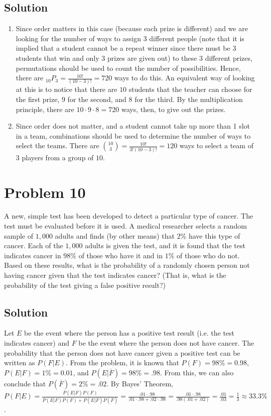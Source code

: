 \documentclass[table]{article}
\begin{document}
\subsection{Solution}
\begin{enumerate}[nosep,label=\alph*)]
\item Since order matters in this case (because each prize is different) and we are looking for the number of ways to assign $3$ different people (note that it is implied that a student cannot be a repeat winner since there must be $3$ students that win and only $3$ prizes are given out) to these $3$ different prizes, permutations should be used to count the number of possibilities. Hence, there are $_{10}P_3 = \frac{10!}{(10-3)!}=720$ ways to do this. An equivalent way of looking at this is to notice that there are $10$ students that the teacher can choose for the first prize, $9$ for the second, and $8$ for the third. By the multiplication principle, there are $10 \cdot 9 \cdot 8 = 720$ ways, then, to give out the prizes.
\item Since order does not matter, and a student cannot take up more than 1 slot in a team, combinations should be used to determine the number of ways to select the teams. There are ${10 \choose 3} = \frac{10!}{3!(10-3)!} = 120$ ways to select a team of $3$ players from a group of $10$.
\end{enumerate}
\section{Problem 10}
A new, simple test has been developed to detect a particular type of cancer. The test must be evaluated before it is used. A medical researcher selects a random sample of $1,000$ adults and finds (by other means) that $2\%$ have this type of cancer. Each of the $1,000$ adults is given the test, and it is found that the test indicates cancer in $98\%$ of those who have it and in $1\%$ of those who do not. Based on these results, what is the probability of a randomly chosen person not having cancer given that the test indicates cancer? (That is, what is the probability of the test giving a false positive result?)
\subsection{Solution}
Let $E$ be the event where the person has a positive test result (i.e. the test indicates cancer) and $F$ be the event where the person does not have cancer. The probability that the person does not have cancer given a positive test can be written as $P(F|E)$. From the problem, it is known that $P(F)=98\%=0.98$, $P(E|F)=1\%=0.01$, and $P(E|\overline{F})=98\%=.98$. From this, we can also conclude that $P(\overline{F})=2\%=.02$. By Bayes' Theorem, $P(F|E) = \frac{P(E|F)P(F)}{P(E|F)P(F)+P(E|\overline{F})P(\overline{F})}=\frac{.01 \cdot .98}{.01 \cdot .98 + .02 \cdot .98}=\frac{.01 \cdot .98}{.98(.01 + .02)}=\frac{.01}{.03}=\frac{1}{3} \approx 33.3\%$.
\end{document}
